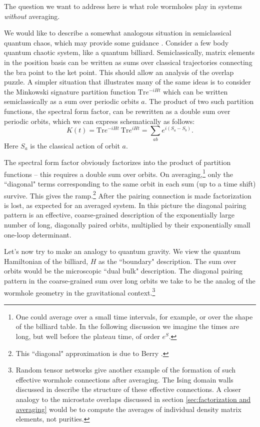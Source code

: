 \documentclass[11pt]{article}
\newcommand{\be}{\begin{equation}}
\newcommand{\ee}{\end{equation}}
\numberwithin{equation}{section}
\def\tr{\text{Tr}}
\begin{document}
The question we want to address here is what role wormholes play in systems \emph{without} averaging.

We would like to describe a somewhat analogous situation in semiclassical quantum chaos, which may provide some guidance \cite{Saad:2019lba}.   Consider a few body quantum chaotic system, like a quantum billiard.   Semiclassically, matrix elements in the position basis can be written as sums over classical trajectories connecting the bra point to the ket point.    This should allow an analysis of the overlap puzzle.      A simpler situation that illustrates  many of the  same ideas is to consider the Minkowski signature partition function $\tr e^{-iHt}$ which can be written semiclassically as a sum over periodic orbits $a$.  The product of two such partition functions, the spectral form factor, can be rewritten as  a double sum over  periodic orbits, which we can express schematically as follows:
\be
K(t) = \tr e^{-iHt} ~ \tr e^{iHt} = \sum_{ab} e^{i (S_a -S_b)} .
\ee
Here $S_a$ is the classical action of orbit $a$.  

The spectral form factor obviously factorizes into the product of partition functions --  this requires a double sum over orbits.
On averaging,\footnote{One could average over a small time intervals, for example, or over the shape of the billiard table.   In the following discussion we imagine the times are long, but well before the plateau time, of order $e^{S}$.}   only the   ``diagonal" terms corresponding to the same orbit in each sum (up to a time shift) survive. This gives the ramp.\footnote{This ``diagonal" approximation is due to Berry \cite{Berry1985SemiclassicalTO}.}   After the pairing connection is made factorization is lost, as expected for an averaged system. In this picture the diagonal pairing pattern is an effective, coarse-grained description of the exponentially large number of long,  diagonally paired orbits, multiplied by their exponentially small one-loop determinant.  

Let's now try to make an analogy to quantum gravity. We view the quantum Hamiltonian of the billiard, $H$ as the ``boundary" description.  The sum over orbits would be the microscopic  ``dual  bulk"  description. The diagonal pairing pattern in the coarse-grained sum over long orbits we take to be the analog of the wormhole geometry in the gravitational context.\footnote{Random tensor networks \cite{Hayden:2016cfa} give another example of the formation of such effective wormhole connections after averaging.   The Ising domain walls discussed in \cite{Hayden:2016cfa} describe the structure of these effective connections. A closer analogy to the microstate overlaps discussed in section \ref{sec:factorization and averaging} would be to compute the averages of individual density matrix elements, not purities.}
\end{document}
